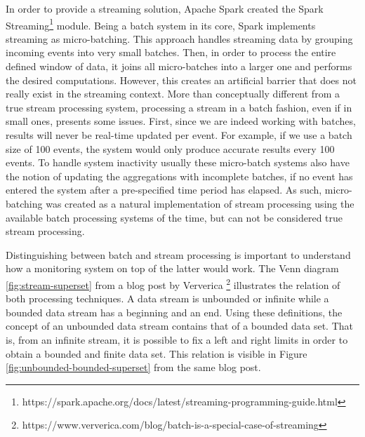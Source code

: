In order to provide a streaming solution, Apache Spark created the Spark Streaming\footnote{https://spark.apache.org/docs/latest/streaming-programming-guide.html} module. Being a batch system in its core, Spark implements streaming as micro-batching. This approach handles streaming data by grouping incoming events into very small batches. Then, in order to process the entire defined window of data, it joins all micro-batches into a larger one and performs the desired computations. However, this creates an artificial barrier that does not really exist in the streaming context. More than conceptually different from a true stream processing system, processing a stream in a batch fashion, even if in small ones, presents some issues. First, since we are indeed working with batches, results will never be real-time updated per event. For example, if we use a batch size of 100 events, the system would only produce accurate results every 100 events. To handle system inactivity usually these micro-batch systems also have the notion of updating the aggregations with incomplete batches, if no event has entered the system after a pre-specified time period has elapsed. As such, micro-batching was created as a natural implementation of stream processing using the available batch processing systems of the time, but can not be considered true stream processing.

Distinguishing between batch and stream processing is important to understand how a monitoring system on top of the latter would work. The Venn diagram \ref{fig:stream-superset} from a blog post by Ververica \footnote{https://www.ververica.com/blog/batch-is-a-special-case-of-streaming} illustrates the relation of both processing techniques. A data stream is unbounded or infinite while a bounded data stream has a beginning and an end. Using these definitions, the concept of an unbounded data stream contains that of a bounded data set. That is, from an infinite stream, it is possible to fix a left and right limits in order to obtain a bounded and finite data set. This relation is visible in Figure \ref{fig:unbounded-bounded-superset} from the same blog post.

